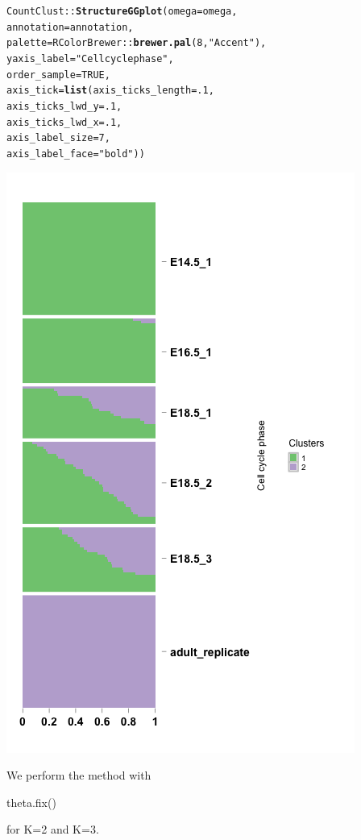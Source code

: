 \documentclass[12pt]{article}\usepackage[]{graphicx}\usepackage[usenames,dvipsnames]{color}
\makeatletter
\newcommand{\hlnum}[1]{\textcolor[rgb]{0.686,0.059,0.569}{#1}}%
\newcommand{\hlstr}[1]{\textcolor[rgb]{0.192,0.494,0.8}{#1}}%
\newcommand{\hlopt}[1]{\textcolor[rgb]{0,0,0}{#1}}%
\newcommand{\hlstd}[1]{\textcolor[rgb]{0.345,0.345,0.345}{#1}}%
\newcommand{\hlkwc}[1]{\textcolor[rgb]{0.333,0.667,0.333}{#1}}%
\newcommand{\hlkwd}[1]{\textcolor[rgb]{0.737,0.353,0.396}{\textbf{#1}}}%
\newenvironment{kframe}{%
 \def\at@end@of@kframe{}%
 \ifinner\ifhmode%
  \def\at@end@of@kframe{\end{minipage}}%
  \begin{minipage}{\columnwidth}%
 \fi\fi%
 \def\FrameCommand##1{\hskip\@totalleftmargin \hskip-\fboxsep
 \colorbox{shadecolor}{##1}\hskip-\fboxsep
     \hskip-\linewidth \hskip-\@totalleftmargin \hskip\columnwidth}%
 \MakeFramed {\advance\hsize-\width
   \@totalleftmargin\z@ \linewidth\hsize
   \@setminipage}}%
 {\par\unskip\endMakeFramed%
 \at@end@of@kframe}
\newenvironment{knitrout}{}{} %
\makeatother
\begin{document}
\begin{knitrout}
\begin{kframe}
\begin{alltt}
\hlstd{CountClust}\hlopt{::}\hlkwd{StructureGGplot}\hlstd{(}\hlkwc{omega} \hlstd{= omega,}
                \hlkwc{annotation} \hlstd{= annotation,}
                \hlkwc{palette} \hlstd{= RColorBrewer}\hlopt{::}\hlkwd{brewer.pal}\hlstd{(}\hlnum{8}\hlstd{,} \hlstr{"Accent"}\hlstd{),}
                \hlkwc{yaxis_label} \hlstd{=} \hlstr{"Cell cycle phase"}\hlstd{,}
                \hlkwc{order_sample} \hlstd{=} \hlnum{TRUE}\hlstd{,}
                \hlkwc{axis_tick} \hlstd{=} \hlkwd{list}\hlstd{(}\hlkwc{axis_ticks_length} \hlstd{=} \hlnum{.1}\hlstd{,}
                                 \hlkwc{axis_ticks_lwd_y} \hlstd{=} \hlnum{.1}\hlstd{,}
                                 \hlkwc{axis_ticks_lwd_x} \hlstd{=} \hlnum{.1}\hlstd{,}
                                 \hlkwc{axis_label_size} \hlstd{=} \hlnum{7}\hlstd{,}
                                 \hlkwc{axis_label_face} \hlstd{=} \hlstr{"bold"}\hlstd{))}
\end{alltt}
\end{kframe}
\includegraphics[width=3 in,height=5 in]{figure/structure_treutlin_classtpx_omega_fix-1} 

\end{knitrout}

We perform the method with \begin{verb} theta.fix() \end{verb} for K=2 and K=3.
\end{document}
